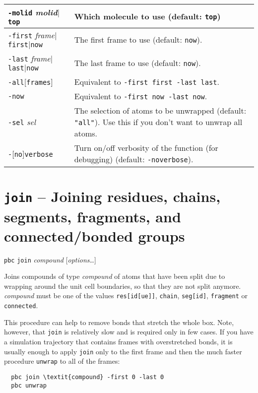 \documentclass[a4paper, DIV12]{scrartcl}
\begin{document}
\begin{tabular}{|p{}|p{}|}
\hline

\texttt{-molid} \textit{molid}$|$\texttt{top}
& Which molecule to use (default: \texttt{top})
\\ \hline

\texttt{-first} \textit{frame}$|$\texttt{first}$|$\texttt{now}
& The first frame to use (default: \texttt{now}).
\\ \hline

\texttt{-last} \textit{frame}$|$\texttt{last}$|$\texttt{now}
& The last frame to use (default: \texttt{now}).
\\ \hline

\texttt{-all}[\texttt{frames}]
& Equivalent to \texttt{-first first -last last}.
\\ \hline

\texttt{-now}
& Equivalent to \texttt{-first now -last now}.
\\ \hline

\texttt{-sel} \textit{sel}
& The selection of atoms to be unwrapped (default: \texttt{"all"}). Use
this if you don't want to unwrap all atoms.
\\ \hline

\texttt{-}[\texttt{no}]\texttt{verbose}
& Turn on/off verbosity of the function (for debugging) (default:
\texttt{-noverbose}).
\\ \hline
\end{tabular}


\newpage
\section{\texttt{join} -- Joining residues, chains, segments, fragments,
  and connected/bonded groups}
\label{sec:join}


\texttt{pbc} \texttt{join} \textit{compound} [\textit{options}\dots]


Joins compounds of type \textit{compound} of atoms that have been
split due to wrapping around the unit cell boundaries, so that they
are not split anymore. \textit{compound} must be one of the values
\texttt{res[id[ue]]}, \texttt{chain}, \texttt{seg[id]},
\texttt{fragment} or \texttt{connected}.

This procedure can help to remove bonds that stretch the whole box.
Note, however, that \texttt{join} is relatively slow and is required
only in few cases.  If you have a simulation trajectory that contains
frames with overstretched bonds, it is usually enough to apply
\texttt{join} only to the first frame and then the much faster
procedure \texttt{unwrap} to all of the frames:
\begin{Verbatim}
  pbc join \textit{compound} -first 0 -last 0 
  pbc unwrap
\end{Verbatim}
\end{document}
